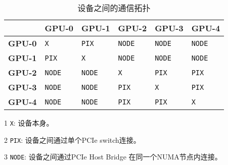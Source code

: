 \begin{table}[h!] %
    \centering
    \caption{设备之间的通信拓扑}\label{table:topo}
    \begin{threeparttable}
    \begin{tabular}{ |p{1.5cm}| p{1.5cm}| p{1.5cm}| p{1.5cm}| p{1.5cm}| p{1.5cm}| }
        \hline
        & \textbf{GPU-0} & \textbf{GPU-1}& \textbf{GPU-2}& \textbf{GPU-3}& \textbf{GPU-4} \\
        \hline
        \textbf{GPU-0} & \texttt{X} & \texttt{PIX} & \texttt{NODE}&  \texttt{NODE}& \texttt{NODE} \\
        \hline
        \textbf{GPU-1} & \texttt{PIX} & \texttt{X} & \texttt{NODE} & \texttt{NODE} & \texttt{NODE} \\
        \hline
        \textbf{GPU-2} & \texttt{NODE} & \texttt{NODE} & \texttt{X} & \texttt{PIX} & \texttt{PIX} \\
        \hline
        \textbf{GPU-3} & \texttt{NODE}& \texttt{NODE} & \texttt{PIX} & \texttt{X} & \texttt{PIX} \\
        \hline
        \textbf{GPU-4} & \texttt{NODE}& \texttt{NODE} & \texttt{PIX}& \texttt{PIX} & \texttt{X}\\
        \hline
    \end{tabular}
    \begin{tablenotes}
        \item[1] \texttt{X}: 设备本身。
        \item[2] \texttt{PIX}: 设备之间通过单个PCIe switch连接。
        \item[3] \texttt{NODE}: 设备之间通过PCIe Host Bridge 在同一个NUMA节点内连接。
    \end{tablenotes}
    \end{threeparttable}
\end{table}